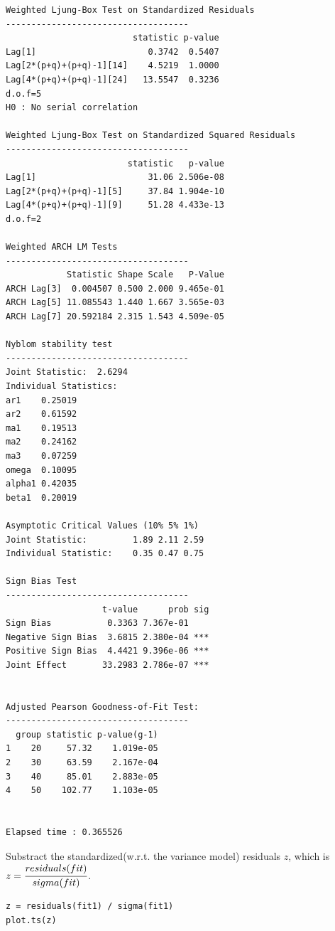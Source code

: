 \documentclass[a4paper, 11pt]{article}
\begin{document}
\begin{verbatim}
Weighted Ljung-Box Test on Standardized Residuals
------------------------------------
                         statistic p-value
Lag[1]                      0.3742  0.5407
Lag[2*(p+q)+(p+q)-1][14]    4.5219  1.0000
Lag[4*(p+q)+(p+q)-1][24]   13.5547  0.3236
d.o.f=5
H0 : No serial correlation

Weighted Ljung-Box Test on Standardized Squared Residuals
------------------------------------
                        statistic   p-value
Lag[1]                      31.06 2.506e-08
Lag[2*(p+q)+(p+q)-1][5]     37.84 1.904e-10
Lag[4*(p+q)+(p+q)-1][9]     51.28 4.433e-13
d.o.f=2

Weighted ARCH LM Tests
------------------------------------
            Statistic Shape Scale   P-Value
ARCH Lag[3]  0.004507 0.500 2.000 9.465e-01
ARCH Lag[5] 11.085543 1.440 1.667 3.565e-03
ARCH Lag[7] 20.592184 2.315 1.543 4.509e-05

Nyblom stability test
------------------------------------
Joint Statistic:  2.6294
Individual Statistics:              
ar1    0.25019
ar2    0.61592
ma1    0.19513
ma2    0.24162
ma3    0.07259
omega  0.10095
alpha1 0.42035
beta1  0.20019

Asymptotic Critical Values (10% 5% 1%)
Joint Statistic:     	 1.89 2.11 2.59
Individual Statistic:	 0.35 0.47 0.75

Sign Bias Test
------------------------------------
                   t-value      prob sig
Sign Bias           0.3363 7.367e-01    
Negative Sign Bias  3.6815 2.380e-04 ***
Positive Sign Bias  4.4421 9.396e-06 ***
Joint Effect       33.2983 2.786e-07 ***


Adjusted Pearson Goodness-of-Fit Test:
------------------------------------
  group statistic p-value(g-1)
1    20     57.32    1.019e-05
2    30     63.59    2.167e-04
3    40     85.01    2.883e-05
4    50    102.77    1.103e-05


Elapsed time : 0.365526
\end{verbatim}

\indent Substract the standardized(w.r.t. the variance model) residuals $z$, which is $z = \cfrac{residuals(fit)}{sigma(fit)}$.

\begin{verbatim}
z = residuals(fit1) / sigma(fit1)
plot.ts(z)
\end{verbatim}
\end{document}

